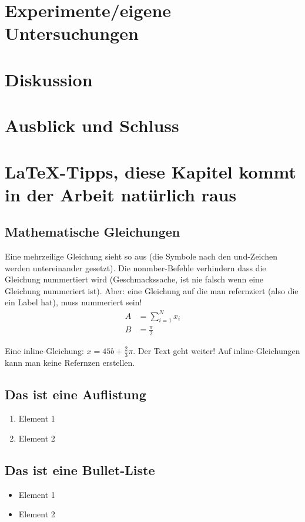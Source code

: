 \documentclass[12pt,oneside]{article}
\begin{document}
\section{Experimente/eigene Untersuchungen}

\section{Diskussion}

\section{Ausblick und Schluss}

\section{LaTeX-Tipps, diese Kapitel kommt in der Arbeit natürlich raus}

\subsection{Mathematische Gleichungen}
Eine mehrzeilige Gleichung sieht so aus (die Symbole nach den und-Zeichen werden untereinander gesetzt). Die nonmber-Befehle verhindern dass die Gleichung nummertiert wird (Geschmackssache, ist nie falsch wenn eine Gleichung nummeriert ist). Aber: eine Gleichung auf die man refernziert (also die ein Label hat), muss nummeriert sein!
\begin{align}
    A &= \sum_{i=1}^N x_i \label{eq:1}\nonumber\\
    B &= \frac{\pi}{2}
\end{align}

Eine inline-Gleichung: $x=45b + \frac{2}{3}\pi$. Der Text geht weiter! Auf inline-Gleichungen kann man keine Refernzen erstellen.

\subsection{Das ist eine Auflistung}
\begin{enumerate}
\item Element 1
\item Element 2
\end{enumerate}

\subsection{Das ist eine Bullet-Liste}
\begin{itemize}
\item Element 1
\item Element 2
\end{itemize}
\end{document}
